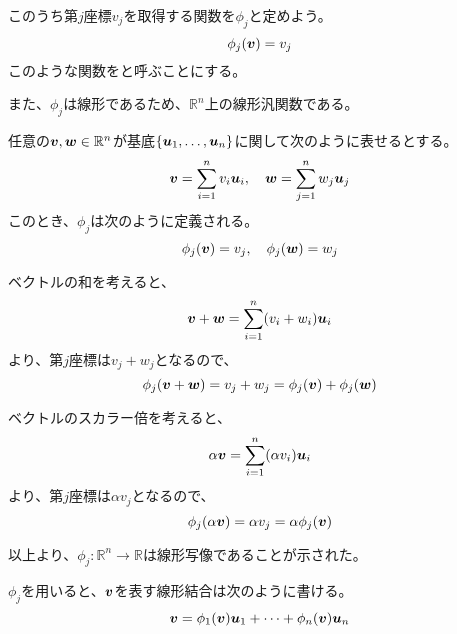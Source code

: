 \documentclass[../../../topic_linear-algebra]{subfiles}
\begin{document}
このうち第$j$座標$v_j$を取得する関数を$\phi_j$と定めよう。
\begin{equation*}
  \phi_j(\vb*{v}) = v_j
\end{equation*}
このような関数をと呼ぶことにする。

\br

また、$\phi_j$は線形であるため、$\mathbb{R}^n$上の線形汎関数である。

\br

\begin{handout}
  任意の$\vb*{v},\vb*{w}\in\mathbb{R}^n$が基底$\{\vb*{u}_1, \ldots, \vb*{u}_n\}$に関して次のように表せるとする。
  \begin{equation*}
    \vb*{v} = \sum_{i=1}^n v_i \vb*{u}_i, \quad \vb*{w} = \sum_{j=1}^n w_j \vb*{u}_j
  \end{equation*}
  このとき、$\phi_j$は次のように定義される。
  \begin{equation*}
    \phi_j(\vb*{v}) = v_j, \quad \phi_j(\vb*{w}) = w_j
  \end{equation*}
  
  \br
  
  ベクトルの和を考えると、
  \begin{equation*}
    \vb*{v} + \vb*{w} = \sum_{i=1}^n (v_i + w_i) \vb*{u}_i
  \end{equation*}
  より、第$j$座標は$v_j+w_j$となるので、
  \begin{equation*}
    \phi_j(\vb*{v} + \vb*{w}) = v_j + w_j = \phi_j(\vb*{v}) + \phi_j(\vb*{w})
  \end{equation*}
  
  \br
  
  ベクトルのスカラー倍を考えると、
  \begin{equation*}
    \alpha \vb*{v} = \sum_{i=1}^n (\alpha v_i) \vb*{u}_i
  \end{equation*}
  より、第$j$座標は$\alpha v_j$となるので、
  \begin{equation*}
    \phi_j(\alpha \vb*{v}) = \alpha v_j = \alpha \phi_j(\vb*{v})
  \end{equation*}
  
  \br
  
  以上より、$\phi_j\colon\mathbb{R}^n\to\mathbb{R}$は線形写像であることが示された。
\end{handout}

\br

$\phi_j$を用いると、$\vb*{v}$を表す線形結合は次のように書ける。
\begin{equation*}
  \vb*{v} = \phi_1(\vb*{v}) \vb*{u}_1 + \cdots + \phi_n(\vb*{v}) \vb*{u}_n
\end{equation*}
\end{document}
